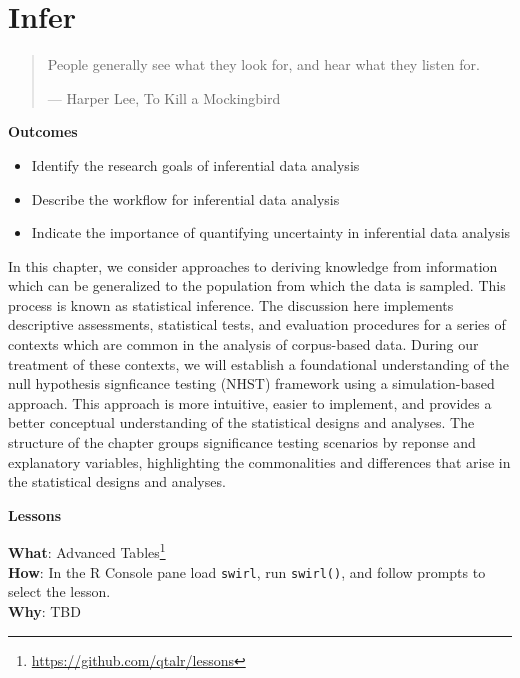 \documentclass[
  letterpaper,
  DIV=11,
  numbers=noendperiod]{scrreprt}
\providecommand{\tightlist}{%
  \setlength{\itemsep}{0pt}\setlength{\parskip}{0pt}}\usepackage{longtable,booktabs,array}
\theoremstyle{definition}
\theoremstyle{remark}
\DeclareRobustCommand{\href}[2]{#2\footnote{\url{#1}}}
\begin{document}
\chapter{Infer}\label{sec-inference}

\begin{quote}
People generally see what they look for, and hear what they listen for.

--- Harper Lee, To Kill a Mockingbird
\end{quote}

\begin{tcolorbox}[enhanced jigsaw, leftrule=.75mm, colframe=quarto-callout-color-frame, colback=white, rightrule=.15mm, opacityback=0, arc=.35mm, breakable, bottomrule=.15mm, left=2mm, toprule=.15mm]

\textbf{ Outcomes}

\begin{itemize}
\tightlist
\item
  Identify the research goals of inferential data analysis
\item
  Describe the workflow for inferential data analysis
\item
  Indicate the importance of quantifying uncertainty in inferential data
  analysis
\end{itemize}

\end{tcolorbox}

In this chapter, we consider approaches to deriving knowledge from
information which can be generalized to the population from which the
data is sampled. This process is known as statistical inference. The
discussion here implements descriptive assessments, statistical tests,
and evaluation procedures for a series of contexts which are common in
the analysis of corpus-based data. During our treatment of these
contexts, we will establish a foundational understanding of the null
hypothesis signficance testing (NHST) framework using a simulation-based
approach. This approach is more intuitive, easier to implement, and
provides a better conceptual understanding of the statistical designs
and analyses. The structure of the chapter groups significance testing
scenarios by reponse and explanatory variables, highlighting the
commonalities and differences that arise in the statistical designs and
analyses.

\begin{tcolorbox}[enhanced jigsaw, leftrule=.75mm, colframe=quarto-callout-color-frame, colback=white, rightrule=.15mm, opacityback=0, arc=.35mm, breakable, bottomrule=.15mm, left=2mm, toprule=.15mm]

\textbf{ Lessons}

\textbf{What}: \href{https://github.com/qtalr/lessons}{Advanced
Tables}\\
\textbf{How}: In the R Console pane load \texttt{swirl}, run
\texttt{swirl()}, and follow prompts to select the lesson.\\
\textbf{Why}:  TBD

\end{tcolorbox}
\end{document}
